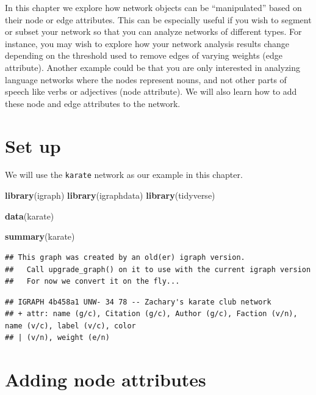 \documentclass[
]{book}
\newenvironment{Shaded}{\begin{snugshade}}{\end{snugshade}}
\newcommand{\FunctionTok}[1]{\textcolor[rgb]{0.13,0.29,0.53}{\textbf{#1}}}
\newcommand{\NormalTok}[1]{#1}
\newcommand{\StringTok}[1]{\textcolor[rgb]{0.31,0.60,0.02}{#1}}
\begin{document}
In this chapter we explore how network objects can be ``manipulated'' based on their node or edge attributes. This can be especially useful if you wish to segment or subset your network so that you can analyze networks of different types. For instance, you may wish to explore how your network analysis results change depending on the threshold used to remove edges of varying weights (edge attribute). Another example could be that you are only interested in analyzing language networks where the nodes represent nouns, and not other parts of speech like verbs or adjectives (node attribute). We will also learn how to add these node and edge attributes to the network.

\section{Set up}\label{set-up}

We will use the \texttt{karate} network as our example in this chapter.

\begin{Shaded}
\begin{Highlighting}[]
\FunctionTok{library}\NormalTok{(igraph)}
\FunctionTok{library}\NormalTok{(igraphdata)}
\FunctionTok{library}\NormalTok{(tidyverse)}

\FunctionTok{data}\NormalTok{(}\StringTok{\textquotesingle{}karate\textquotesingle{}}\NormalTok{)}

\FunctionTok{summary}\NormalTok{(karate)}
\end{Highlighting}
\end{Shaded}

\begin{verbatim}
## This graph was created by an old(er) igraph version.
##   Call upgrade_graph() on it to use with the current igraph version
##   For now we convert it on the fly...
\end{verbatim}

\begin{verbatim}
## IGRAPH 4b458a1 UNW- 34 78 -- Zachary's karate club network
## + attr: name (g/c), Citation (g/c), Author (g/c), Faction (v/n), name (v/c), label (v/c), color
## | (v/n), weight (e/n)
\end{verbatim}

\section{Adding node attributes}\label{adding-node-attributes}
\end{document}
